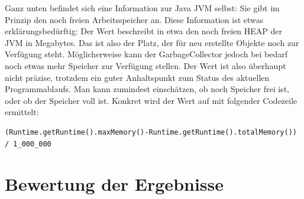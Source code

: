 \documentclass[12pt,a4paper]{article}
\begin{document}
Ganz unten befindet sich eine Information zur Java JVM selbst: Sie gibt im Prinzip den noch freien Arbeitsspeicher an. Diese Information ist etwas erklärungsbedürftig: Der Wert beschreibt in etwa den noch freien HEAP der JVM in Megabytes. Das ist also der Platz, der für neu erstellte Objekte noch zur Verfügung steht. Möglicherweise kann der GarbageCollector jedoch bei bedarf noch etwas mehr Speicher zur Verfügung stellen. Der Wert ist also überhaupt nicht präzise, trotzdem ein guter Anhaltspunkt zum Status des aktuellen Programmablaufs. Man kann zumindest einschätzen, ob noch Speicher frei ist, oder ob der Speicher voll ist. Konkret wird der Wert auf mit folgender Codezeile ermittelt:


\begin{lstlisting}
(Runtime.getRuntime().maxMemory()-Runtime.getRuntime().totalMemory()) / 1_000_000
\end{lstlisting}


\section{Bewertung der Ergebnisse}
\end{document}
